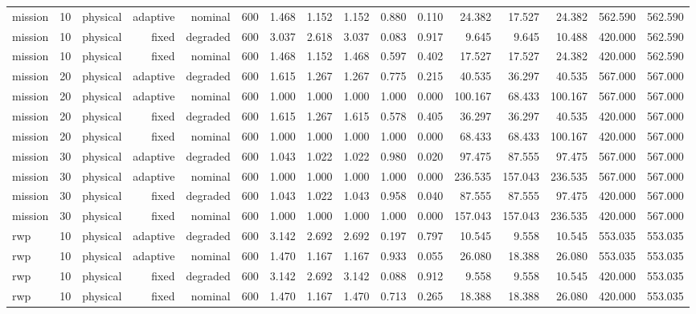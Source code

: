 \begin{tabular}{lrrrrrrrrrrrrrrr}
mission & 10 & physical & adaptive & nominal & 600 & 1.468 & 1.152 & 1.152 & 0.880 & 0.110 & 24.382 & 17.527 & 24.382 & 562.590 & 562.590 \\
mission & 10 & physical & fixed & degraded & 600 & 3.037 & 2.618 & 3.037 & 0.083 & 0.917 & 9.645 & 9.645 & 10.488 & 420.000 & 562.590 \\
mission & 10 & physical & fixed & nominal & 600 & 1.468 & 1.152 & 1.468 & 0.597 & 0.402 & 17.527 & 17.527 & 24.382 & 420.000 & 562.590 \\
mission & 20 & physical & adaptive & degraded & 600 & 1.615 & 1.267 & 1.267 & 0.775 & 0.215 & 40.535 & 36.297 & 40.535 & 567.000 & 567.000 \\
mission & 20 & physical & adaptive & nominal & 600 & 1.000 & 1.000 & 1.000 & 1.000 & 0.000 & 100.167 & 68.433 & 100.167 & 567.000 & 567.000 \\
mission & 20 & physical & fixed & degraded & 600 & 1.615 & 1.267 & 1.615 & 0.578 & 0.405 & 36.297 & 36.297 & 40.535 & 420.000 & 567.000 \\
mission & 20 & physical & fixed & nominal & 600 & 1.000 & 1.000 & 1.000 & 1.000 & 0.000 & 68.433 & 68.433 & 100.167 & 420.000 & 567.000 \\
mission & 30 & physical & adaptive & degraded & 600 & 1.043 & 1.022 & 1.022 & 0.980 & 0.020 & 97.475 & 87.555 & 97.475 & 567.000 & 567.000 \\
mission & 30 & physical & adaptive & nominal & 600 & 1.000 & 1.000 & 1.000 & 1.000 & 0.000 & 236.535 & 157.043 & 236.535 & 567.000 & 567.000 \\
mission & 30 & physical & fixed & degraded & 600 & 1.043 & 1.022 & 1.043 & 0.958 & 0.040 & 87.555 & 87.555 & 97.475 & 420.000 & 567.000 \\
mission & 30 & physical & fixed & nominal & 600 & 1.000 & 1.000 & 1.000 & 1.000 & 0.000 & 157.043 & 157.043 & 236.535 & 420.000 & 567.000 \\
rwp & 10 & physical & adaptive & degraded & 600 & 3.142 & 2.692 & 2.692 & 0.197 & 0.797 & 10.545 & 9.558 & 10.545 & 553.035 & 553.035 \\
rwp & 10 & physical & adaptive & nominal & 600 & 1.470 & 1.167 & 1.167 & 0.933 & 0.055 & 26.080 & 18.388 & 26.080 & 553.035 & 553.035 \\
rwp & 10 & physical & fixed & degraded & 600 & 3.142 & 2.692 & 3.142 & 0.088 & 0.912 & 9.558 & 9.558 & 10.545 & 420.000 & 553.035 \\
rwp & 10 & physical & fixed & nominal & 600 & 1.470 & 1.167 & 1.470 & 0.713 & 0.265 & 18.388 & 18.388 & 26.080 & 420.000 & 553.035 \\

\end{tabular}
